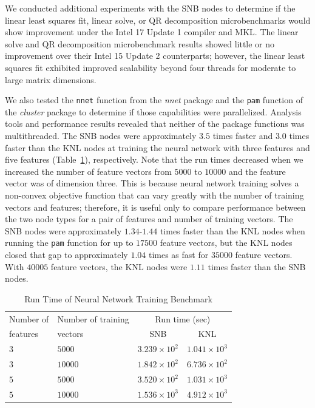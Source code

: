 We conducted additional experiments with the SNB nodes to determine if the linear least
squares fit, linear solve, or QR decomposition microbenchmarks would show improvement
under the Intel 17 Update 1 compiler and MKL. The linear solve and QR decomposition
microbenchmark results showed little or no improvement over their Intel 15 Update 2
counterparts; however, the linear least squares fit exhibited improved scalability beyond
four threads for moderate to large matrix dimensions.

We also tested the \texttt{nnet} function from the \textit{nnet} package and the
\texttt{pam} function of the \textit{cluster} package to determine if those capabilities
were parallelized.
Analysis tools and performance results revealed that neither of the package functions was
multithreaded.  The SNB nodes were approximately $3.5$
times faster and $3.0$ times faster than the KNL nodes at training the neural network with
three features and five features (Table~\ref{tab:nnetResults}), respectively. Note that
the run times decreased when we increased the number of feature vectors from $5000$ to
$10000$ and the feature vector was of dimension three. This is because neural network
training solves a non-convex objective function that can vary greatly with the number of
training vectors and features; therefore, it is useful only to compare performance between
the two node types for a pair of features and number of training vectors. The SNB nodes
were approximately $1.34$-$1.44$ times faster than the KNL nodes when running the
\texttt{pam} function for up to $17500$ feature vectors, but the KNL nodes closed that gap
to approximately $1.04$ times as fast for $35000$ feature vectors. With $40005$ feature
vectors, the KNL nodes were $1.11$ times faster than the SNB nodes.

\begin{table}
  \caption{Run Time of Neural Network Training Benchmark}
  \label{tab:nnetResults}
  \begin{tabular}{llcc}
    \toprule
      Number of & Number of training & \multicolumn{2}{c}{Run time (sec)}\\
      features  & vectors            & SNB & KNL\\
    \midrule
    $3$ & $5000$  & $3.239\times 10^{2}$ & $1.041\times 10^{3}$ \\ %
    $3$ & $10000$ & $1.842\times 10^{2}$ & $6.736\times 10^{2}$ \\ %
    $5$ & $5000$  & $3.520\times 10^{2}$ & $1.031\times 10^{3}$ \\ %
    $5$ & $10000$ & $1.536\times 10^{3}$ & $4.912\times 10^{3}$ \\ %
    \bottomrule
  \end{tabular}
\end{table}

